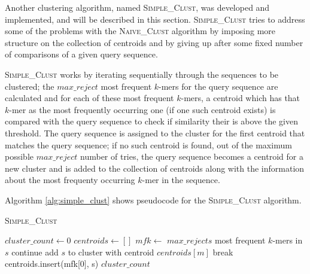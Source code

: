 Another clustering algorithm, named \textsc{Simple\_Clust}, was developed and
implemented, and will be described in this section. \textsc{Simple\_Clust}
tries to address some of the problems with the \textsc{Naive\_Clust} algorithm
by imposing more structure on the collection of centroids and by giving up
after some fixed number of comparisons of a given query sequence.


\textsc{Simple\_Clust} works by iterating sequentially through the sequences to
be clustered; the $max\_reject$ most frequent $k$-mers for the query sequence
are calculated and for each of these most frequent $k$-mers, a centroid which
has that $k$-mer as the most frequently occurring one (if one such centroid
exists) is compared with the query sequence to check if similarity their is
above the given threshold. The query sequence is assigned to the cluster for
the first centroid that matches the query sequence; if no such centroid is
found, out of the maximum possible $max\_reject$ number of tries, the query
sequence becomes a centroid for a new cluster and is added to the collection of
centroids along with the information about the most frequenty occurring $k$-mer
in the sequence.  %


Algorithm \ref{alg:simple_clust} shows pseudocode for the
\textsc{Simple\_Clust} algorithm.

\begin{algorithm}
  \caption{\textsc{Simple\_Clust}}
  \label{alg:simple_clust}
  \begin{algorithmic}[1]
    \Statex
      \State $cluster\_count \gets 0$
      \State $centroids \gets []$ 
        \State $mfk \gets$ $max\_rejects$ most frequent $k$-mers in $s$
            \State continue
            \State add $s$ to cluster with centroid $centroids[m]$
            \State break
          \EndIf
        \EndFor
          \State centroids.insert(mfk[0], s)
        \EndIf
      \EndFor
      \State \Return $cluster\_count$
    \EndFunction
  \end{algorithmic}
\end{algorithm}


